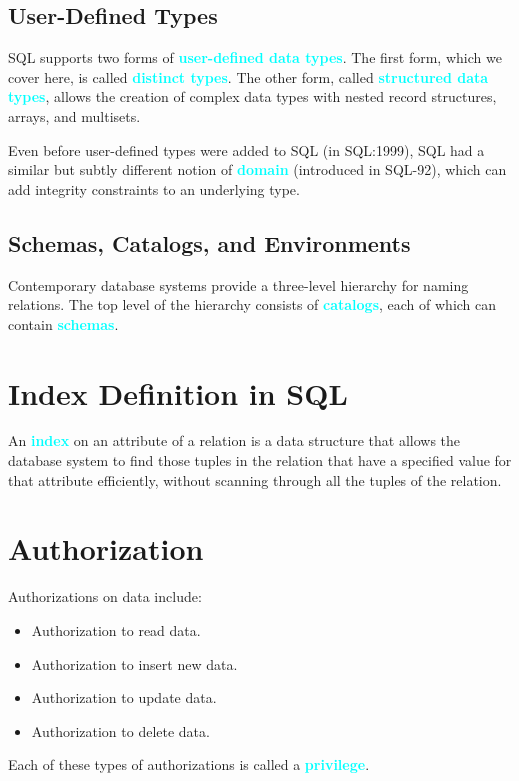 \documentclass[a4paper,12pt,twoside,openany]{book}
\newcommand{\textcy}[1]{\textbf{\textcolor{cyan}{#1}}}
\begin{document}
\subsection{User-Defined Types}

SQL supports two forms of \textcy{user-defined data types}. The first form, which we cover here, is called \textcy{distinct types}. The other form, called \textcy{structured data types}, allows the creation of complex data types with nested record structures, arrays, and multisets.

Even before user-defined types were added to SQL (in SQL:1999), SQL had a similar but subtly different notion of \textcy{domain} (introduced in SQL-92), which can add integrity constraints to an underlying type.

\subsection{Schemas, Catalogs, and Environments}

Contemporary database systems provide a three-level hierarchy for naming relations. The top level of the hierarchy consists of \textcy{catalogs}, each of which can contain \textcy{schemas}.

\section{Index Definition in SQL}

An \textcy{index} on an attribute of a relation is a data structure that allows the database system to find those tuples in the relation that have a specified value for that attribute efficiently, without scanning through all the tuples of the relation.

\section{Authorization}

Authorizations on data include:
\begin{itemize}
    \item Authorization to read data.
    \item Authorization to insert new data.
    \item Authorization to update data.
    \item Authorization to delete data.
\end{itemize}
Each of these types of authorizations is called a \textcy{privilege}.
\end{document}
